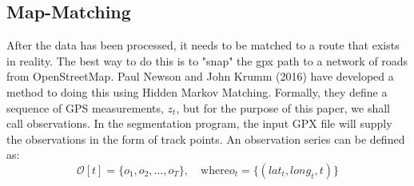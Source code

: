 \documentclass[12pt,a4paper]{report}
\begin{document}
\subsection{Map-Matching}
After the data has been processed, it needs to be matched to a route that exists in reality. The best way to do this is to "snap" the gpx path to a network of roads from OpenStreetMap.
Paul Newson and John Krumm (2016) have developed a method to doing this using Hidden Markov Matching.
Formally, they define a sequence of GPS measurements, $z_t$, but for the purpose of this paper, we shall call observations.
In the segmentation program, the input GPX file will supply the observations in the form of track points.
An observation series can be defined as:
\\
\[
	\mathcal{O}[t] = \{o_1,o_2,\dots,o_T\}, \quad \text{where} o_t = \{(lat_t,long_t,t)\}
\]
\end{document}
